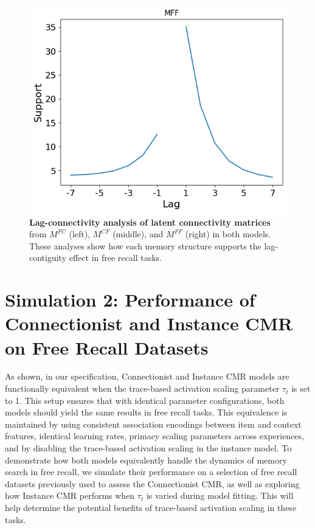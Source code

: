 \documentclass[
  letterpaper,
  11pt,
  english,
  singlespacing,
  headsepline]{MastersDoctoralThesis}
\begin{document}
\begin{figure}
\begin{minipage}{0.33\linewidth}
\includegraphics{icmr_figures/mff_lag_connectivity.png}\end{minipage}%

\caption{\label{fig-lag-connectivity}\textbf{Lag-connectivity analysis
of latent connectivity matrices} from \(M^{FC}\) (left), \(M^{CF}\)
(middle), and \(M^{FF}\) (right) in both models. These analyses show how
each memory structure supports the lag-contiguity effect in free recall
tasks.}

\end{figure}%

\section{Simulation 2: Performance of Connectionist and Instance CMR on
Free Recall
Datasets}\label{simulation-2-performance-of-connectionist-and-instance-cmr-on-free-recall-datasets}

As shown, in our specification, Connectionist and Instance CMR models
are functionally equivalent when the trace-based activation scaling
parameter \(\tau_{t}\) is set to 1. This setup ensures that with
identical parameter configurations, both models should yield the same
results in free recall tasks. This equivalence is maintained by using
consistent association encodings between item and context features,
identical learning rates, primacy scaling parameters across experiences,
and by disabling the trace-based activation scaling in the instance
model. To demonstrate how both models equivalently handle the dynamics
of memory search in free recall, we simulate their performance on a
selection of free recall datasets previously used to assess the
Connectionist CMR, as well as exploring how Instance CMR performs when
\(\tau_{t}\) is varied during model fitting. This will help determine
the potential benefits of trace-based activation scaling in these tasks.
\end{document}
